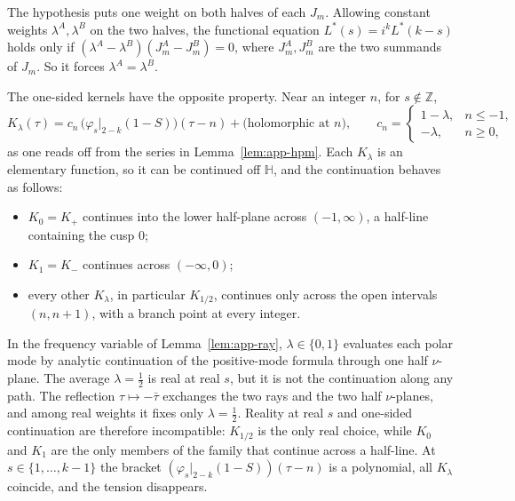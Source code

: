 \documentclass[11pt]{article}
\newcommand{\HH}{\mathbb{H}}
\newcommand{\ZZ}{\mathbb{Z}}
\begin{document}
The hypothesis puts one weight on both halves of each $J_m$. Allowing constant weights
$\lambda^A,\lambda^B$ on the two halves, the functional equation $L^*(s)=i^kL^*(k-s)$ holds only if
$(\lambda^A-\lambda^B)(J^A_m-J^B_m)=0$, where $J^A_m,J^B_m$ are the two summands of $J_m$. So it
forces $\lambda^A=\lambda^B$.

The one-sided kernels have the opposite property. Near an integer $n$, for $s\notin\ZZ$,
\[
K_\lambda(\tau)=c_n\,\big(\varphi_s|_{2-k}(1-S)\big)(\tau-n)+\big(\text{holomorphic at }n\big),\qquad
c_n=\begin{cases}1-\lambda,&n\le-1,\\-\lambda,&n\ge0,\end{cases}
\]
as one reads off from the series in Lemma~\ref{lem:app-hpm}. Each $K_\lambda$ is an elementary
function, so it can be continued off $\HH$, and the continuation behaves as follows:
\begin{itemize}
\item $K_0=K_+$ continues into the lower half-plane across $(-1,\infty)$, a half-line containing
the cusp $0$;
\item $K_1=K_-$ continues across $(-\infty,0)$;
\item every other $K_\lambda$, in particular $K_{1/2}$, continues only across the open intervals
$(n,n+1)$, with a branch point at every integer.
\end{itemize}
In the frequency variable of Lemma~\ref{lem:app-ray}, $\lambda\in\{0,1\}$ evaluates each polar mode
by analytic continuation of the positive-mode formula through one half $\nu$-plane. The average
$\lambda=\frac12$ is real at real $s$, but it is not the continuation along any path. The
reflection $\tau\mapsto-\bar\tau$ exchanges the two rays and the two half $\nu$-planes, and among
real weights it fixes only $\lambda=\frac12$. Reality at real $s$ and one-sided continuation are
therefore incompatible: $K_{1/2}$ is the only real choice, while $K_0$ and $K_1$ are the only members
of the family that continue across a half-line. At $s\in\{1,\dots,k-1\}$ the bracket
$(\varphi_s|_{2-k}(1-S))(\tau-n)$ is a polynomial, all $K_\lambda$ coincide, and the tension
disappears.
\end{document}
